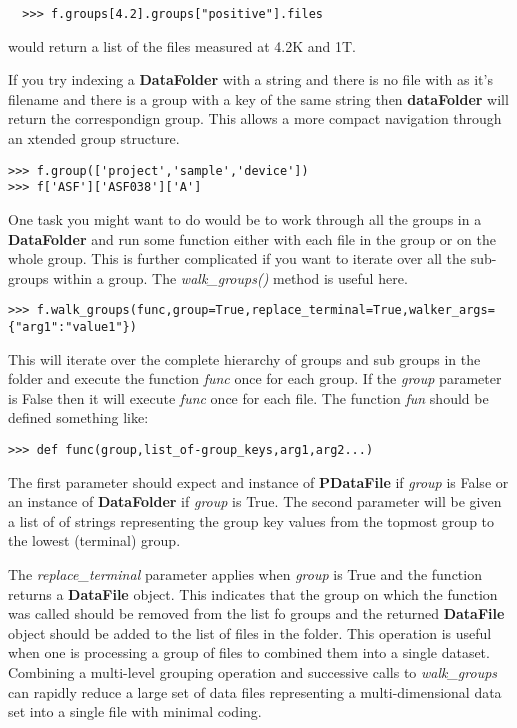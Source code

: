 \documentclass[a4paper,11pt]{scrartcl}
\begin{document}
\begin{verbatim}
  >>> f.groups[4.2].groups["positive"].files
\end{verbatim}

would return a list of the files measured at 4.2K and 1T.

If you try indexing a \textbf{DataFolder} with a string and there is no file with as it's filename and there is a group with a key of the same string then \textbf{dataFolder} will return the correspondign group. This allows a more compact navigation through an xtended group structure.

\begin{verbatim}
>>> f.group(['project','sample','device'])
>>> f['ASF']['ASF038']['A']
\end{verbatim}

One task you might want to do would be to work through all the groups in a \textbf{DataFolder} and run some function either with each file in the group or on the whole group. This is further complicated if you want to iterate over all the sub-groups within a group. The \textit{walk\_groups()} method is useful here.
\begin{verbatim}
>>> f.walk_groups(func,group=True,replace_terminal=True,walker_args={"arg1":"value1"})
\end{verbatim}

This will iterate over the complete hierarchy of groups and sub groups in the folder and execute the function \textit{func} once for each group. If the \textit{group} parameter is False then it will execute \textit{func} once for each file. The function \textit{fun} should be defined something like:
\begin{verbatim}
>>> def func(group,list_of-group_keys,arg1,arg2...)
\end{verbatim}
The first parameter should expect and instance of \textbf{PDataFile} if \textit{group} is False or an instance of \textbf{DataFolder} if \textit{group} is True. The second parameter will be given a list of of strings representing the group key values from the topmost group to the lowest (terminal) group.

The \textit{replace\_terminal} parameter applies when \textit{group} is True and the function returns a \textbf{DataFile} object. This indicates that the group on which the function was called should be removed from the list fo groups and the returned \textbf{DataFile} object should be added to the list of files in the folder. This operation is useful when one is processing a group of files to combined them into a single dataset. Combining a multi-level grouping operation and successive calls to \textit{walk\_groups} can rapidly reduce a large set of data files representing a multi-dimensional data set into a single file with minimal coding.
\end{document}
